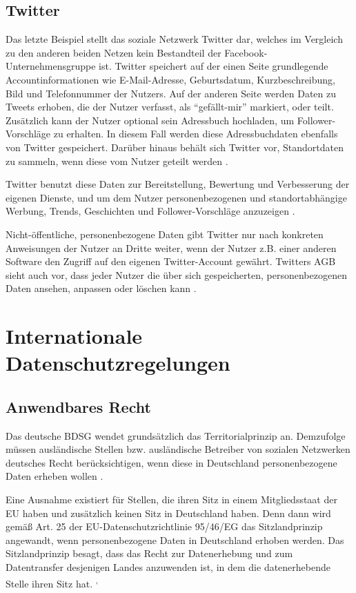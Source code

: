 \section{Twitter}
Das letzte Beispiel stellt das soziale Netzwerk Twitter dar, welches im Vergleich zu den anderen beiden Netzen kein Bestandteil der Facebook-Unternehmensgruppe ist. Twitter speichert auf der einen Seite grundlegende Accountinformationen wie E-Mail-Adresse, Geburtsdatum, Kurzbeschreibung, Bild und Telefonnummer der Nutzers.  Auf der anderen Seite werden Daten zu Tweets erhoben, die der Nutzer verfasst, als "`gefällt-mir"' markiert, oder teilt. Zusätzlich kann der Nutzer optional sein Adressbuch hochladen, um Follower-Vorschläge zu erhalten. In diesem Fall werden diese Adressbuchdaten ebenfalls von Twitter gespeichert. Darüber hinaus behält sich Twitter vor, Standortdaten zu sammeln, wenn diese vom Nutzer geteilt werden \autocite[vgl.][]{TwitterInc..2017}.
\par
Twitter benutzt diese Daten zur Bereitstellung, Bewertung und Verbesserung der eigenen Dienste, und um dem Nutzer personenbezogenen und standortabhängige Werbung, Trends, Geschichten und Follower-Vorschläge anzuzeigen \autocite[vgl.][]{TwitterInc..2017}. 
\par
Nicht-öffentliche, personenbezogene Daten gibt Twitter nur nach konkreten Anweisungen der Nutzer an Dritte weiter, wenn der Nutzer z.B. einer anderen Software den Zugriff auf den eigenen Twitter-Account gewährt. Twitters AGB sieht auch vor, dass jeder Nutzer die über sich gespeicherten, personenbezogenen Daten ansehen, anpassen oder löschen kann \autocite[vgl.][]{TwitterInc..2017}.

\chapter{Internationale Datenschutzregelungen}
\section{Anwendbares Recht}
Das deutsche \ac{BDSG} wendet grundsätzlich das Territorialprinzip an. Demzufolge müssen ausländische Stellen bzw. ausländische Betreiber von sozialen Netzwerken deutsches Recht berücksichtigen, wenn diese in Deutschland personenbezogene Daten erheben wollen \autocite[vgl.][]{ICS.2011}.
\par
Eine Ausnahme existiert für Stellen, die ihren Sitz in einem Mitgliedsstaat der \ac{EU} haben und zusätzlich keinen Sitz in Deutschland haben. Denn dann wird gemäß Art. 25 der EU-Datenschutzrichtlinie 95/46/EG das Sitzlandprinzip angewandt, wenn personenbezogene Daten in Deutschland erhoben werden. Das Sitzlandprinzip besagt, dass das Recht zur Datenerhebung und zum Datentransfer desjenigen Landes anzuwenden ist, in dem die datenerhebende Stelle ihren Sitz hat. \autocite[vgl.][]{ICS.2011}\textsuperscript{,}\autocite[vgl.][]{EG.1995}

